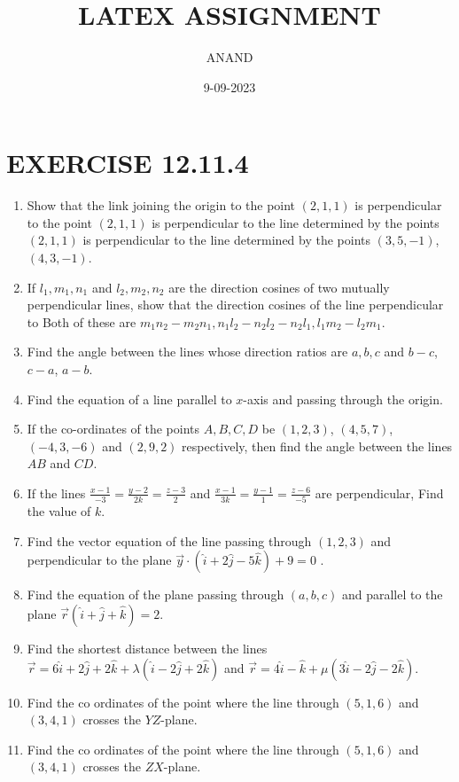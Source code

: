 \documentclass{article}
\theoremstyle{remark}
\begin{document}
\title{LATEX ASSIGNMENT}
\author{ANAND}
\date{9-09-2023}
\maketitle
\section*{EXERCISE 12.11.4}
\begin{enumerate}
\item Show that the link joining the origin to the point $(2,1,1)$ is perpendicular to the point $(2,1,1)$ is perpendicular to the line determined by the points $(2,1,1)$ is perpendicular to the line determined by the points $(3,5,-1)$, $(4,3,-1)$.
\item If $l_1,m_1,n_1$ and $l_2,m_2,n_2$ are the direction cosines of two mutually perpendicular lines, show that the direction cosines of the line perpendicular to Both of these are $m_{1}n_{2}-m_{2}n_{1}, n_{1}l_{2}-n_{2}l_{2}-n_{2}l_{1}, l_{1}m_{2}-l_{2}m_{1}$.
\item Find the angle between the lines whose direction ratios are $a, b, c$ and $b-c$, $c-a$, $a-b$.
\item Find the equation of a line parallel to $x$-axis and passing through the origin.
\item If the co-ordinates of the points $A,B,C,D$ be $(1,2,3)$, $(4,5,7)$, $(-4,3,-6)$ and $(2,9,2)$ respectively, then find the angle between the lines $AB$ and $CD$.
\item If the lines $\frac{x-1}{-3}=\frac{y-2}{2k}=\frac{z-3}{2}$ and $\frac{x-1}{3k}=\frac{y-1}{1}=\frac{z-6}{-5}$ are perpendicular, Find the value of $k$.
\item Find the vector equation of the line passing through $(1,2,3)$ and perpendicular to the plane $\overrightarrow{y}\cdot(\hat{i}+2\hat{j}-5\hat{k})+9=0$ .
\item Find the equation of the plane passing through $(a,b,c)$ and parallel to the plane $\overrightarrow{r}(\hat{i}+\hat{j}+\hat{k})=2$.
\item Find the shortest distance between the lines $\overrightarrow{r}=6\hat{i}+2\hat{j}+2\hat{k}+\lambda(\hat{i}-2\hat{j}+2\hat{k})$ and $\overrightarrow{r}=4\hat{i}-\hat{k}+\mu(3\hat{i}-2\hat{j}-2\hat{k})$.
\item Find the co ordinates of the point where the line through $(5,1,6)$ and $(3,4,1)$ crosses the $YZ$-plane.
\item Find the co ordinates of the point where the line through $(5,1,6)$ and $(3,4,1)$ crosses the $ZX$-plane.

\end{enumerate}
\end{document}
